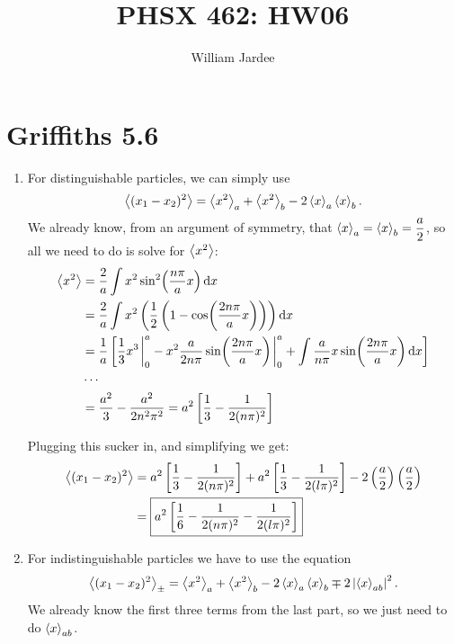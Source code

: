 \documentclass[11pt]{article}
\begin{document}
\title{PHSX 462: HW06}
\author{William Jardee}
\maketitle


\section*{Griffiths 5.6}
\begin{enumerate}[label=\alph*)]
\item
For distinguishable particles, we can simply use 
\[\ev{(x_1 - x_2)^2} = \ev{x^2}_a + \ev{x^2}_b - 2\ev{x}_a\ev{x}_b.\]
We already know, from an argument of symmetry, that $\displaystyle{\ev{x}_a = \ev{x}_b = \frac{a}{2}}$, so all we need to do is solve for $\ev{x^2}$:
\begin{align*}
\ev{x^2} & = \frac{2}{a}\int x^2 \sin[2](\frac{n\pi}{a}x)\dd{x}\\
& = \frac{2}{a}\int x^2\left(\frac{1}{2}\left(1 - \cos(\frac{2n\pi}{a}x)\right)\right)\dd{x}\\
& = \frac{1}{a}\left[\frac{1}{3}x^3\eval^a_0 - x^2\frac{a}{2n\pi}\sin(\frac{2n\pi}{a}x)\eval^a_0 + \int \frac{a}{n\pi}x \sin(\frac{2n\pi}{a}x)\dd{x}\right]\\
& \cdots\\
&= \frac{a^2}{3} - \frac{a^2}{2n^2\pi^2} = a^2\left[\frac{1}{3}-\frac{1}{2(n\pi)^2}\right]
\end{align*}

Plugging this sucker in, and simplifying we get:
\begin{align*}
\ev{(x_1-x_2)^2} & = a^2\left[\frac{1}{3}-\frac{1}{2(n\pi)^2}\right] + a^2\left[\frac{1}{3}-\frac{1}{2(l\pi)^2}\right] - 2\left(\frac{a}{2}\right)\left(\frac{a}{2}\right)\\
& = \boxed{a^2\left[\frac{1}{6} - \frac{1}{2(n\pi)^2} - \frac{1}{2(l\pi)^2}\right]}
\end{align*}

\item For indistinguishable particles we have to use the equation
\[\ev{(x_1 - x_2)^2}_\pm = \ev{x^2}_a + \ev{x^2}_b - 2\ev{x}_a\ev{x}_b \mp 2\left|\ev{x}_{ab}\right|^2.\]
We already know the first three terms from the last part, so we just need to do $\ev{x}_{ab}$.


\end{enumerate}
\end{document}
